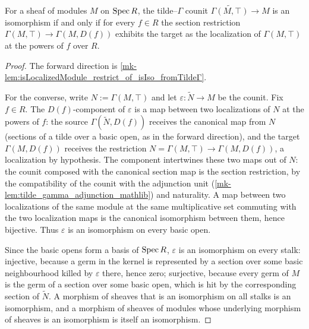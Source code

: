 \begin{lemma}
  \label{mk-lem:isIso_fromTildeΓ_iff_isLocalizedModule_restrict}
  \leanok

  For a sheaf of modules \(M\) on \(\operatorname{Spec} R\), the tilde--\(\Gamma\) counit
  \(\widetilde{\Gamma(M, \top)} \to M\) is an isomorphism if and only if for every
  \(f \in R\) the section restriction \(\Gamma(M, \top) \to \Gamma(M, D(f))\) exhibits
  the target as the localization of \(\Gamma(M, \top)\) at the powers of \(f\) over
  \(R\).
\end{lemma}
\begin{proof}
  \leanok
  The forward direction is \ref{mk-lem:isLocalizedModule_restrict_of_isIso_fromTildeΓ}.

  For the converse, write \(N := \Gamma(M, \top)\) and let
  \(\varepsilon : \widetilde{N} \to M\) be the counit. Fix \(f \in R\). The
  \(D(f)\)-component of \(\varepsilon\) is a map between two localizations of \(N\) at
  the powers of \(f\): the source \(\Gamma(\widetilde{N}, D(f))\) receives the canonical
  map from \(N\) (sections of a tilde over a basic open, as in the forward direction),
  and the target \(\Gamma(M, D(f))\) receives the restriction
  \(N = \Gamma(M, \top) \to \Gamma(M, D(f))\), a localization by hypothesis. The
  component intertwines these two maps out of \(N\): the counit composed with the
  canonical section map is the section restriction, by the compatibility of the counit
  with the adjunction unit (\ref{mk-lem:tilde_gamma_adjunction_mathlib}) and naturality.
  A map between two localizations of the same module at the same multiplicative set
  commuting with the two localization maps is the canonical isomorphism between them,
  hence bijective. Thus \(\varepsilon\) is an isomorphism on every basic open.

  Since the basic opens form a basis of \(\operatorname{Spec} R\), \(\varepsilon\) is an isomorphism
  on every stalk: injective, because a germ in the kernel is represented by a section
  over some basic neighbourhood killed by \(\varepsilon\) there, hence zero; surjective,
  because every germ of \(M\) is the germ of a section over some basic open, which is
  hit by the corresponding section of \(\widetilde{N}\). A morphism of sheaves that is
  an isomorphism on all stalks is an isomorphism, and a morphism of sheaves of
  modules whose underlying morphism of sheaves is an isomorphism is itself an
  isomorphism.
\end{proof}

